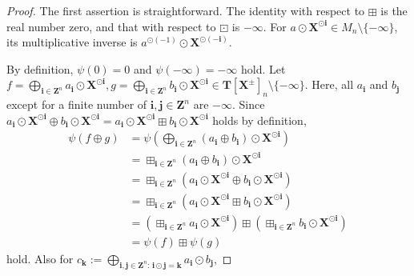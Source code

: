 \documentclass[10pt,a4paper]{amsart}
\begin{document}
\begin{proof}
The first assertion is straightforward.
The identity with respect to $\boxplus$ is the real number zero, and that with respect to $\boxdot$ is $-\infty$.
For $a \odot \boldsymbol{X}^{\odot \boldsymbol{i}} \in M_n \setminus \{ -\infty \}$, its multiplicative inverse is $a^{\odot (-1)} \odot \boldsymbol{X}^{\odot (-\boldsymbol{i})}$.

By definition, $\psi(0) = 0$ and $\psi(-\infty) = -\infty$ hold.
Let $f = \bigoplus_{\boldsymbol{i} \in \boldsymbol{Z}^n} a_{\boldsymbol{i}} \odot \boldsymbol{X}^{\odot \boldsymbol{i}}, g = \bigoplus_{\boldsymbol{i} \in \boldsymbol{Z}^n} b_{\boldsymbol{i}} \odot \boldsymbol{X}^{\odot \boldsymbol{i}} \in \boldsymbol{T}[\boldsymbol{X}^{\pm}]_n \setminus \{ -\infty \}$.
Here, all $a_{\boldsymbol{i}}$ and $b_{\boldsymbol{j}}$ except for a finite number of $\boldsymbol{i}, \boldsymbol{j} \in \boldsymbol{Z}^n$ are $-\infty$.
Since $a_{\boldsymbol{i}} \odot \boldsymbol{X}^{\odot \boldsymbol{i}} \oplus b_{\boldsymbol{i}} \odot \boldsymbol{X}^{\odot \boldsymbol{i}} = a_{\boldsymbol{i}} \odot \boldsymbol{X}^{\odot \boldsymbol{i}} \boxplus b_{\boldsymbol{i}} \odot \boldsymbol{X}^{\odot \boldsymbol{i}}$ holds by definition, 
\begin{align*}
\psi(f \oplus g) &= \psi \left( \bigoplus_{\boldsymbol{i} \in \boldsymbol{Z}^n} (a_{\boldsymbol{i}} \oplus b_{\boldsymbol{i}}) \odot \boldsymbol{X}^{\odot \boldsymbol{i}} \right)\\
&
= \boxplus_{\boldsymbol{i} \in \boldsymbol{Z}^n} (a_{\boldsymbol{i}} \oplus b_{\boldsymbol{i}}) \odot \boldsymbol{X}^{\odot \boldsymbol{i}}\\
&= \boxplus_{\boldsymbol{i} \in \boldsymbol{Z}^n} (a_{\boldsymbol{i}} \odot \boldsymbol{X}^{\odot \boldsymbol{i}} \oplus b_{\boldsymbol{i}} \odot \boldsymbol{X}^{\odot \boldsymbol{i}})\\
&= \boxplus_{\boldsymbol{i} \in \boldsymbol{Z}^n} (a_{\boldsymbol{i}} \odot \boldsymbol{X}^{\odot \boldsymbol{i}} \boxplus b_{\boldsymbol{i}} \odot \boldsymbol{X}^{\odot \boldsymbol{i}})\\
&= \left( \boxplus_{\boldsymbol{i} \in \boldsymbol{Z}^n} a_{\boldsymbol{i}} \odot \boldsymbol{X}^{\odot \boldsymbol{i}} \right) \boxplus \left( \boxplus_{\boldsymbol{i} \in \boldsymbol{Z}^n} b_{\boldsymbol{i}} \odot \boldsymbol{X}^{\odot \boldsymbol{i}} \right)\\
&= \psi(f) \boxplus \psi(g)
\end{align*}
hold.
Also for $c_{\boldsymbol{k}} := \bigoplus_{\boldsymbol{i}, \boldsymbol{j} \in \boldsymbol{Z}^n :\, \boldsymbol{i} \odot \boldsymbol{j} = \boldsymbol{k}} a_{\boldsymbol{i}} \odot b_{\boldsymbol{j}}$,

\end{proof}
\end{document}
